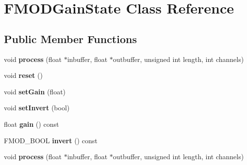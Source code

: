 \hypertarget{class_f_m_o_d_gain_state}{\section{F\+M\+O\+D\+Gain\+State Class Reference}
\label{class_f_m_o_d_gain_state}
}
\subsection*{Public Member Functions}
\begin{DoxyCompactItemize}
\item 
\hypertarget{class_f_m_o_d_gain_state_a7082d52458f703011b9fc1c74a6bb27a}{void {\bfseries process} (float $\ast$inbuffer, float $\ast$outbuffer, unsigned int length, int channels)}\label{class_f_m_o_d_gain_state_a7082d52458f703011b9fc1c74a6bb27a}

\item 
\hypertarget{class_f_m_o_d_gain_state_a073e3755bebb99a7a49d570f47b2c39c}{void {\bfseries reset} ()}\label{class_f_m_o_d_gain_state_a073e3755bebb99a7a49d570f47b2c39c}

\item 
\hypertarget{class_f_m_o_d_gain_state_a97c3c310c9d8147bed3e06a9425117e2}{void {\bfseries set\+Gain} (float)}\label{class_f_m_o_d_gain_state_a97c3c310c9d8147bed3e06a9425117e2}

\item 
\hypertarget{class_f_m_o_d_gain_state_a03247336c400f9e34116aa0e3cf2c87c}{void {\bfseries set\+Invert} (bool)}\label{class_f_m_o_d_gain_state_a03247336c400f9e34116aa0e3cf2c87c}

\item 
\hypertarget{class_f_m_o_d_gain_state_a9545e8c89d8fe048b8648937fa7d3535}{float {\bfseries gain} () const }\label{class_f_m_o_d_gain_state_a9545e8c89d8fe048b8648937fa7d3535}

\item 
\hypertarget{class_f_m_o_d_gain_state_a7ee6a09a04c1a2ad4d80433480d1db85}{F\+M\+O\+D\+\_\+\+B\+O\+O\+L {\bfseries invert} () const }\label{class_f_m_o_d_gain_state_a7ee6a09a04c1a2ad4d80433480d1db85}

\item 
\hypertarget{class_f_m_o_d_gain_state_a7082d52458f703011b9fc1c74a6bb27a}{void {\bfseries process} (float $\ast$inbuffer, float $\ast$outbuffer, unsigned int length, int channels)}\label{class_f_m_o_d_gain_state_a7082d52458f703011b9fc1c74a6bb27a}


\end{DoxyCompactItemize}
